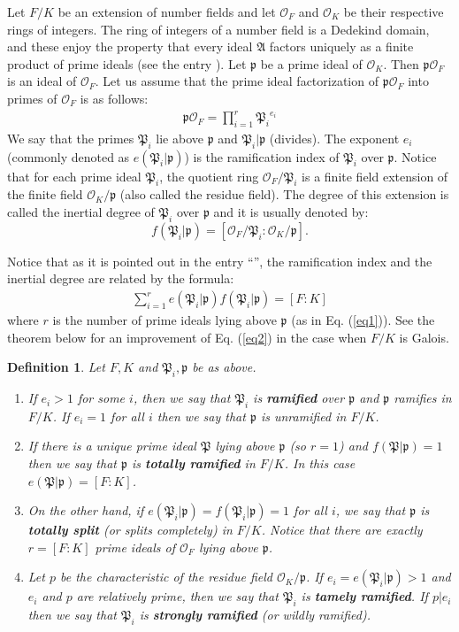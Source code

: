 \documentclass[12pt]{article}
\newtheorem{defn}{Definition}
\newcommand{\p}{{\mathfrak{p}}}
\newcommand{\A}{{\mathfrak{A}}}
\renewcommand{\P}{{\mathfrak{P}}}
\newcommand{\intK}{\mathcal{O}_K}
\newcommand{\intF}{\mathcal{O}_F}
\begin{document}
Let $F/K$ be an extension of number fields and let $\mathcal{O}_F$ and $\mathcal{O}_K$ be their respective rings of integers. The ring of integers of a number field is a Dedekind domain, and these enjoy the property that every ideal $\A$ factors uniquely as a finite product of prime ideals (see the entry ). Let $\p$ be a prime ideal of $\intK$. Then $\p \intF$ is an ideal of $\intF$. Let us assume that the prime ideal factorization of $\p \intF$ into primes of $\intF$ is as follows:
\begin{eqnarray}
\label{eq1} \p \intF=\prod_{i=1}^r {\P_i}^{e_i}
\end{eqnarray}
We say that the primes $\P_i$ lie above $\p$ and $\P_i|\p$ (divides). The exponent $e_i$ (commonly denoted as $e(\P_i|\p)$) is the ramification index of $\P_i$ over $\p$. Notice that for each prime ideal $\P_i$, the quotient ring $\intF/\P_i$ is a finite field extension of the finite field $\intK/\p$ (also called the residue field). The degree of this extension is called the inertial degree of $\P_i$ over $\p$ and it is usually denoted by:
$$f(\P_i|\p)=[\intF/\P_i:\intK/\p].$$

Notice that as it is pointed out in the entry ``'', the ramification index and the inertial degree are related by the formula:
\begin{eqnarray}
\label{eq2}
\sum_{i=1}^r e(\P_i|\p)f(\P_i|\p)=[F:K]
\end{eqnarray}
where $r$ is the number of prime ideals lying above $\p$ (as in Eq. (\ref{eq1})). See the theorem below for an improvement of Eq. (\ref{eq2}) in the case when $F/K$ is Galois.
\begin{defn}
Let $F,K$ and $\P_i,\p$ be as above.
\begin{enumerate}
\item If $e_i>1$ for some $i$, then we say that $\P_i$ is {\bf ramified} over $\p$ and $\p$ ramifies in $F/K$. If $e_i=1$ for all $i$ then we say that $\p$ is unramified in $F/K$.
\item If there is a unique prime ideal $\P$ lying above $\p$ (so $r=1$) and $f(\P|\p)=1$ then we say that $\p$ is {\bf totally ramified} in $F/K$. In this case $e(\P|\p)=[F:K]$.
\item On the other hand, if $e(\P_i|\p)=f(\P_i|\p)=1$ for all $i$, we say that $\p$ is {\bf totally split} (or splits completely) in $F/K$. Notice that there are exactly $r=[F:K]$ prime ideals of $\intF$ lying above $\p$.
\item  Let $p$ be the characteristic of the residue field $\intK/\p$. If $e_i=e(\P_i|\p)>1$ and $e_i$ and $p$ are relatively prime, then we say that $\P_i$ is {\bf tamely ramified}. If $p|e_i$ then we say that $\P_i$ is {\bf strongly ramified} (or wildly ramified). 
\end{enumerate}
\end{defn}
\end{document}
